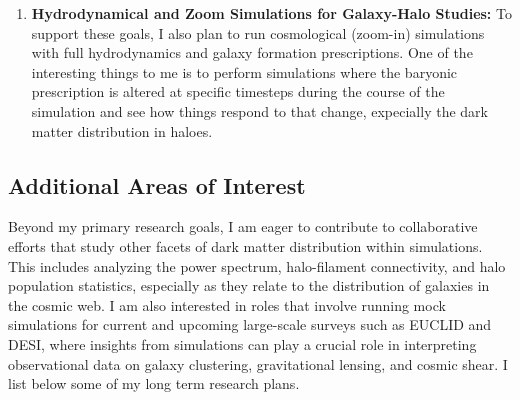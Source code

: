 \documentclass[11pt]{article}
\begin{document}
\begin{enumerate}

    \item \textbf{Hydrodynamical and Zoom Simulations for Galaxy-Halo Studies:} To support these goals, I also plan to run cosmological (zoom-in) simulations with full hydrodynamics and galaxy formation prescriptions. One of the interesting things to me is to perform simulations where the baryonic prescription is altered at specific timesteps during the course of the simulation and see how things respond to that change, expecially the dark matter distribution in haloes.
\end{enumerate}

\subsection{Additional Areas of Interest}
Beyond my primary research goals, I am eager to contribute to collaborative efforts that study other facets of dark matter distribution within simulations. This includes analyzing the power spectrum, halo-filament connectivity, and halo population statistics, especially as they relate to the distribution of galaxies in the cosmic web. I am also interested in roles that involve running mock simulations for current and upcoming large-scale surveys such as EUCLID and DESI, where insights from simulations can play a crucial role in interpreting observational data on galaxy clustering, gravitational lensing, and cosmic shear. I list below some of my long term research plans.

\end{document}
